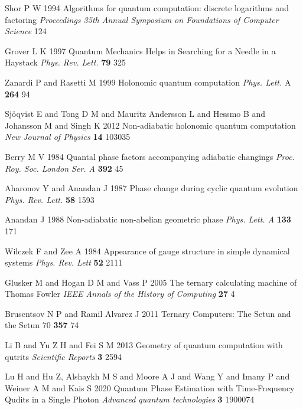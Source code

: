 \begin{enumerate}[label={[\arabic*]}]
\item Shor P W 1994 Algorithms for quantum computation: discrete logarithms and factoring \textit{Proceedings 35th Annual Symposium on Foundations of Computer Science} 124

\item Grover L K 1997 Quantum Mechanics Helps in Searching for a Needle in a Haystack \textit{Phys. Rev. Lett.} \textbf{79} 325

\item Zanardi P and Rasetti M 1999 Holonomic quantum computation \textit{Phys. Lett.} A \textbf{264} 94

\item Sjöqvist E and Tong D M and Mauritz Andersson L and Hessmo B and Johansson M and Singh K 2012 Non-adiabatic holonomic quantum computation \textit{New Journal of Physics} \textbf{14} 103035

\item Berry M V 1984 Quantal phase factors accompanying adiabatic changings \textit{Proc. Roy. Soc. London Ser. A} \textbf{392} 45

\item Aharonov Y and Anandan J 1987 Phase change during cyclic quantum evolution \textit{Phys. Rev. Lett.} \textbf{58} 1593

\item Anandan J 1988 Non-adiabatic non-abelian geometric phase \textit{Phys. Lett. A}  \textbf{133} 171

\item Wilczek F and Zee A 1984 Appearance of gauge structure in simple dynamical systems \textit{Phys. Rev. Lett} \textbf{52} 2111

\item Glusker M and Hogan D M and Vass P 2005 The ternary calculating machine of Thomas Fowler \textit{IEEE Annals of the History of Computing} \textbf{27} 4

\item Brusentsov N P and Ramil Alvarez J 2011 Ternary Computers: The Setun and the Setun 70 \textbf{357} 74

\item Li B and Yu Z H and Fei S M 2013 Geometry of quantum computation with qutrits \textit{Scientific Reports} \textbf{3} 2594

\item Lu H and Hu Z, Alshaykh M S and Moore A J and Wang Y and Imany P and Weiner A M and Kais S 2020 Quantum Phase Estimation with Time‐Frequency Qudits in a Single Photon \textit{Advanced quantum technologies} \textbf{3} 1900074


\end{enumerate}
